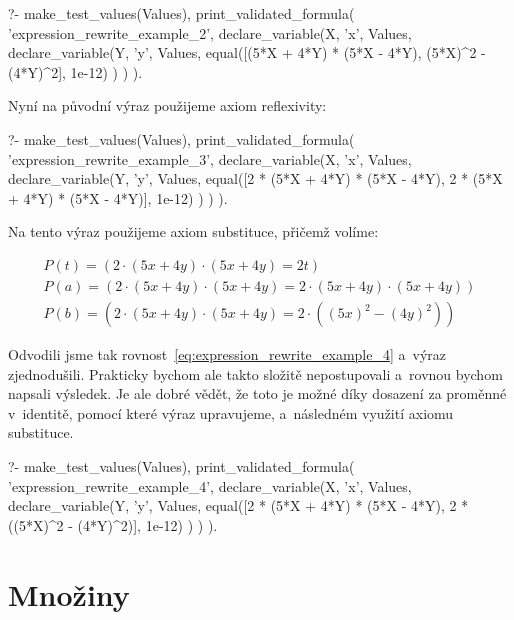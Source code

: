 \begin{prolog}
?- 	make_test_values(Values),
	print_validated_formula(
		'expression_rewrite_example_2',
		declare_variable(X, 'x', Values,
			declare_variable(Y, 'y', Values,
				equal([(5*X + 4*Y) * (5*X - 4*Y), (5*X)^2 - (4*Y)^2], 1e-12)
			)
		)
	).
\end{prolog}

Nyní na původní výraz použijeme axiom reflexivity:

\begin{prolog}
?- 	make_test_values(Values),
	print_validated_formula(
		'expression_rewrite_example_3',
		declare_variable(X, 'x', Values,
			declare_variable(Y, 'y', Values,
				equal([2 * (5*X + 4*Y) * (5*X - 4*Y), 2 * (5*X + 4*Y) * (5*X - 4*Y)], 1e-12)
			)
		)
	).
\end{prolog}

Na tento výraz použijeme axiom substituce, přičemž volíme:

\begin{equation}
\begin{split}
P(t) = (2 \cdot (5 x + 4 y) \cdot (5 x + 4 y) = 2 t) \\
P(a) = (2 \cdot (5 x + 4 y) \cdot (5 x + 4 y) = 2 \cdot (5 x + 4 y) \cdot (5 x + 4 y)) \\
P(b) = (2 \cdot (5 x + 4 y) \cdot (5 x + 4 y) = 2 \cdot ((5 x)^2 - (4 y)^2))
\end{split}
\end{equation}

Odvodili jsme tak rovnost~\eqref{eq:expression_rewrite_example_4} a~výraz zjednodušili. Prakticky bychom ale takto složitě nepostupovali a~rovnou bychom napsali výsledek. Je ale dobré vědět, že toto je možné díky dosazení za proměnné v~identitě, pomocí které výraz upravujeme, a~následném využití axiomu substituce.

\begin{prolog}
?- 	make_test_values(Values),
	print_validated_formula(
		'expression_rewrite_example_4',
		declare_variable(X, 'x', Values,
			declare_variable(Y, 'y', Values,
				equal([2 * (5*X + 4*Y) * (5*X - 4*Y), 2 * ((5*X)^2 - (4*Y)^2)], 1e-12)
			)
		)
	).
\end{prolog}

\section{Množiny}

